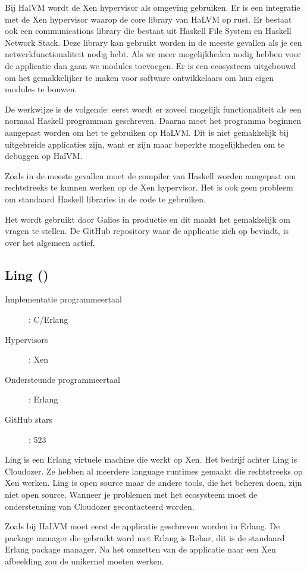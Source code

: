 \documentclass[pdftex,a4paper,12pt,twoside]{report}
\begin{document}
Bij HalVM wordt de Xen hypervisor als omgeving gebruiken. Er is een integratie met de Xen hypervisor waarop de core library van HaLVM op rust. Er bestaat ook een communications library die bestaat uit Haskell File System en Haskell Network Stack. Deze library kan gebruikt worden in de meeste gevallen als je een netwerkfunctionaliteit nodig hebt. Als we meer mogelijkheden nodig hebben voor de applicatie dan gaan we modules toevoegen. Er is een ecosysteem uitgebouwd om het gemakkelijker te maken voor software ontwikkelaars om hun eigen modules te bouwen.

De werkwijze is de volgende: eerst wordt er zoveel mogelijk functionaliteit als een normaal Haskell programman geschreven. Daarna moet het programma beginnen aangepast worden om het te gebruiken op HaLVM.
Dit is niet gemakkelijk bij uitgebreide applicaties zijn, want er zijn maar beperkte mogelijkheden om te debuggen op HalVM.

Zoals in de meeste gevallen moet de compiler van Haskell worden aangepast om rechtstreeks te kunnen werken op de Xen hypervisor. Het is ook geen probleem om standaard Haskell libraries in de code te gebruiken.

Het wordt gebruikt door Galios in productie en dit maakt het gemakkelijk om vragen te stellen. De GitHub repository waar de applicatie zich op bevindt, is over het algemeen actief.

\subsection{Ling (\cite{erlang_on_xen_cloudozer/ling_????})}

\begin{description}
  \item [Implementatie programmeertaal]: C/Erlang
  \item [Hypervisors]: Xen
  \item [Ondersteunde programmeertaal]: Erlang
  \item [GitHub stars]: 523
\end{description}

Ling is een Erlang virtuele machine die werkt op Xen. Het bedrijf achter Ling is Cloudozer. Ze hebben al meerdere language runtimes gemaakt die rechtstreeks op Xen werken.
Ling is open source maar de andere tools, die het beheren doen, zijn niet open source. Wanneer je problemen met het ecosysteem moet de ondersteuning van Cloudozer gecontacteerd worden.

Zoals bij HaLVM moet eerst de applicatie geschreven worden in Erlang. De package manager die gebruikt word met Erlang is Rebar, dit is de standaard Erlang package manager. Na het omzetten van de applicatie naar een Xen afbeelding zou de unikernel moeten werken.
\end{document}
